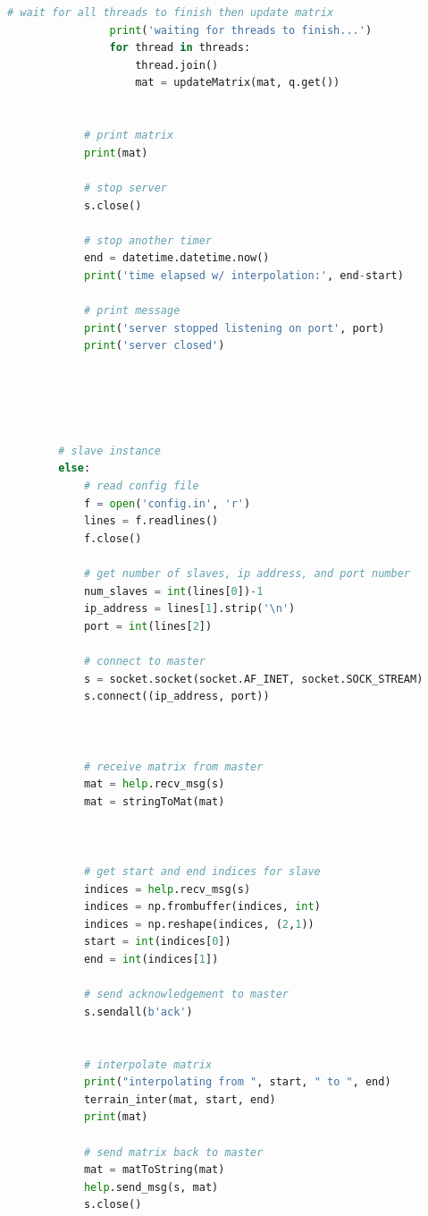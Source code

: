 \documentclass{article}
\begin{document}
\begin{lstlisting}[language=Python]
                # wait for all threads to finish then update matrix
                print('waiting for threads to finish...')
                for thread in threads:
                    thread.join()
                    mat = updateMatrix(mat, q.get())
                        

            # print matrix
            print(mat)

            # stop server
            s.close()

            # stop another timer
            end = datetime.datetime.now()
            print('time elapsed w/ interpolation:', end-start)

            # print message
            print('server stopped listening on port', port)
            print('server closed')
            




        # slave instance
        else:
            # read config file
            f = open('config.in', 'r')
            lines = f.readlines()
            f.close()

            # get number of slaves, ip address, and port number
            num_slaves = int(lines[0])-1
            ip_address = lines[1].strip('\n')
            port = int(lines[2])

            # connect to master
            s = socket.socket(socket.AF_INET, socket.SOCK_STREAM)
            s.connect((ip_address, port))


            
            # receive matrix from master
            mat = help.recv_msg(s)
            mat = stringToMat(mat)



            # get start and end indices for slave
            indices = help.recv_msg(s)
            indices = np.frombuffer(indices, int)
            indices = np.reshape(indices, (2,1))
            start = int(indices[0])
            end = int(indices[1])

            # send acknowledgement to master
            s.sendall(b'ack')


            # interpolate matrix
            print("interpolating from ", start, " to ", end)
            terrain_inter(mat, start, end)
            print(mat)

            # send matrix back to master
            mat = matToString(mat)
            help.send_msg(s, mat)
            s.close()


\end{lstlisting}
\end{document}

